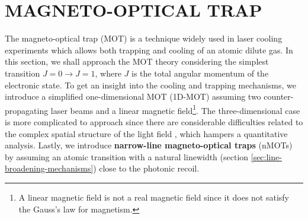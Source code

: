 %
\chapter{MAGNETO-OPTICAL TRAP}
\label{ch:MOT}
%

The magneto-optical trap (MOT) is a technique widely used in laser cooling experiments which allows both trapping and cooling of an atomic dilute gas. In this section, we shall approach the MOT theory \cite{krzysztof2010magneto, perrin2014doppler} considering the simplest transition $ J = 0 \rightarrow J = 1$, where $ J $ is the total angular momentum of the electronic state. To get an insight into the cooling and trapping mechanisms, we introduce a simplified one-dimensional MOT (1D-MOT) assuming two counter-propagating laser beams and a linear magnetic field\footnote{A linear magnetic field is not a real magnetic field since it does not satisfy the Gauss's law for magnetism.}. The three-dimensional case is more complicated to approach since there are considerable difficulties related to the complex spatial structure of the light field \cite{prudnikov2015three}, which hampers a quantitative analysis. Lastly, we introduce \textbf{narrow-line magneto-optical traps} (nMOTs) \cite{loftus2004narrow} by assuming an atomic transition with a natural linewidth (section \ref{sec:line-broadening-mechanisms}) close to the photonic recoil.


%


%


%
